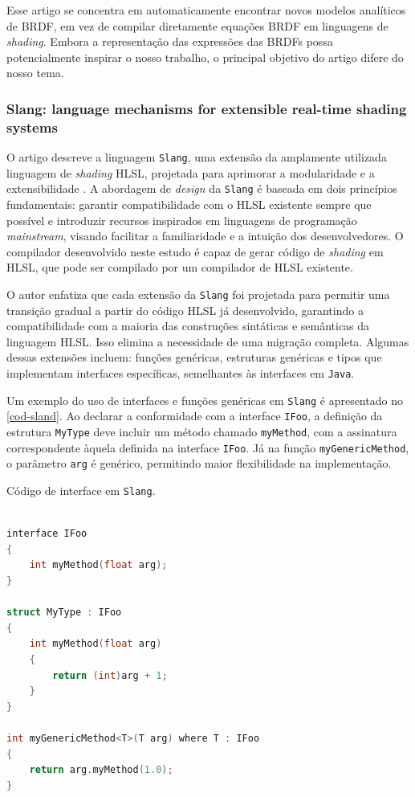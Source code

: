 Esse artigo se concentra em automaticamente encontrar novos modelos analíticos de BRDF, em vez de compilar diretamente equações BRDF em linguagens de \textit{shading}. Embora a representação das expressões das BRDFs possa potencialmente inspirar o nosso trabalho, o principal objetivo do artigo difere do nosso tema.


\subsubsection{Slang: language mechanisms for extensible real-time shading systems}


O artigo descreve a linguagem \texttt{Slang}, uma extensão da amplamente utilizada linguagem de \textit{shading} HLSL, projetada para aprimorar a modularidade e a extensibilidade \cite{slang}. A abordagem de \textit{design} da \texttt{Slang} é baseada em dois princípios fundamentais: garantir compatibilidade com o HLSL existente sempre que possível e introduzir recursos inspirados em linguagens de programação \textit{mainstream}, visando facilitar a familiaridade e a intuição dos desenvolvedores. O compilador desenvolvido neste estudo é capaz de gerar código de \textit{shading} em HLSL, que pode ser compilado por um compilador de HLSL existente.

O autor enfatiza que cada extensão da \texttt{Slang} foi projetada para permitir uma transição gradual a partir do código HLSL já desenvolvido, garantindo a compatibilidade com a maioria das construções sintáticas e semânticas da linguagem HLSL. Isso elimina a necessidade de uma migração completa. Algumas dessas extensões incluem: funções genéricas, estruturas genéricas e tipos que implementam interfaces específicas, semelhantes às interfaces em \texttt{Java}.

Um exemplo do uso de interfaces e funções genéricas em \texttt{Slang} é apresentado no \autoref{cod-sland}. Ao declarar a conformidade com a interface \texttt{IFoo}, a definição da estrutura \texttt{MyType} deve incluir um método chamado \texttt{myMethod}, com a assinatura correspondente àquela definida na interface \texttt{IFoo}. Já na função \texttt{myGenericMethod}, o parâmetro \texttt{arg} é genérico, permitindo maior flexibilidade na implementação.


\begin{codigo}[H]
  \caption{\small Código de interface em \texttt{Slang}. }
  \label{cod-sland}
\begin{lstlisting}[language=C, frame=none, inputencoding=utf8]

interface IFoo
{
    int myMethod(float arg);
}

struct MyType : IFoo
{
    int myMethod(float arg)
    {
        return (int)arg + 1;
    }
}

int myGenericMethod<T>(T arg) where T : IFoo
{
    return arg.myMethod(1.0);
}
\end{lstlisting}
\end{codigo}




